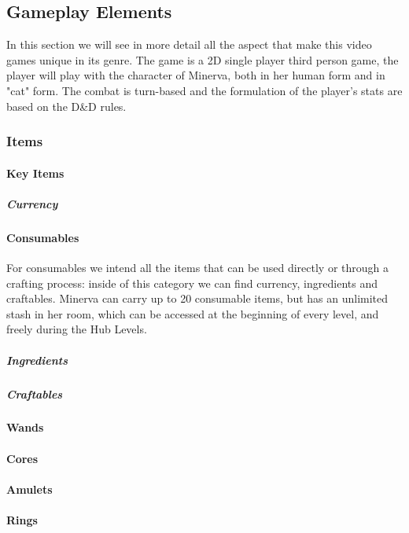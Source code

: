 \subsection{Gameplay Elements}

In this section we will see in more detail all the aspect that make this video games unique in its genre. The game is a 2D single player third person game, the player will play with the character of Minerva, both in her human form and in "cat" form. The combat is turn-based and the formulation of the player's stats are based on the D\&D rules.



\subsubsection{Items}

\paragraph{Key Items}


\subparagraph{Currency}


\pagebreak
\paragraph{Consumables}
For consumables we intend all the items that can be used directly or through a crafting process: inside of this category we can find currency, ingredients and craftables. Minerva can carry up to 20 consumable items, but has an unlimited stash in her room, which can be accessed at the beginning of every level, and freely during the Hub Levels. 

\subparagraph{Ingredients}


\subparagraph{Craftables}


\paragraph{Wands}


\paragraph{Cores}


\paragraph{Amulets}


\paragraph{Rings}


